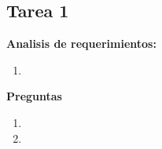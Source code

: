 \documentclass{report}
\begin{document}
	
	
	
	\begin{center}
		\section*{\LARGE{Tarea 1}}
	\end{center}

    \begin{center}
        \LARGE{\textbf{Analisis de requerimientos:}}\\
    \end{center}
        \normalsize
        \begin{enumerate}
            \item 
        \end{enumerate}


    \begin{center}
        \LARGE{\textbf{Preguntas}}\\
    \end{center}
    \normalsize
    \begin{enumerate}%
        \item 
        \item 
    \end{enumerate}
    \newpage
    
    \printbibliography
  
\end{document}
